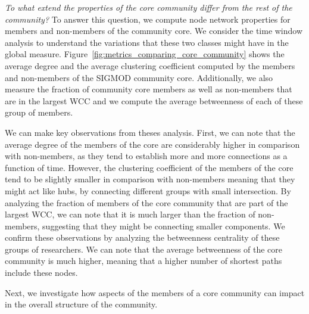 \textit{To what extend the properties of the core community differ from the rest of the community?}  To answer this question, we compute node network properties for members and non-members of the community
core. We consider the time window analysis to understand the variations that these two classes might have in the global measure.
Figure~\ref{fig:metrics_comparing_core_community} shows the average degree and the average clustering coefficient computed by the members and non-members of the SIGMOD 
community core. Additionally, we also measure the fraction of community core members as well as non-members that are in the largest WCC and we compute the average betweenness of
each of these group of members. 

We can make key observations
from theses analysis. First, we can note that the average degree of the members of the core are considerably higher in comparison with non-members, as they tend to establish more and
more connections as a function of time. However, the clustering coefficient of the members of the core tend to be slightly smaller in comparison with non-members meaning that they
might act like hubs, by connecting different groups with small intersection. By analyzing the fraction of members of the core community that are part of the largest
WCC, we can note that it is much larger than the fraction of non-members, suggesting that they might be connecting smaller components. 
We confirm these observations by analyzing the betweenness centrality of these groups of researchers. We can note that the average betweenness of the core community is much higher,
meaning that a higher number of shortest paths include these nodes. 

Next, we investigate how
aspects of the members of a core community can impact in the overall structure of the community.


